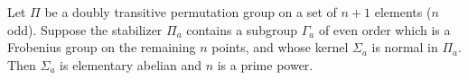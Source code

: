 Let $\Pi$ be a doubly transitive permutation group on a set of $n+1$ elements ($n$ odd). Suppose the stabilizer $\Pi_a$ contains a subgroup $\Gamma_a$ of even order which is a Frobenius group on the remaining $n$ points, and whose kernel $\Sigma_a$ is normal in $\Pi_a$. Then $\Sigma_a$ is elementary abelian and $n$ is a prime power.
